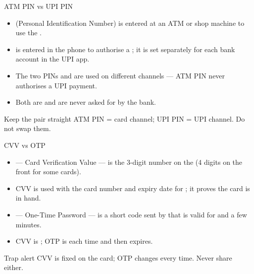 \documentclass[aspectratio=169]{beamer}
\begin{document}
\begin{frame}{ATM PIN vs UPI PIN}
  \begin{itemize}
    \item {} (Personal Identification Number) is entered at an
      ATM or shop machine to use the .
    \item {} is entered in the phone to authorise a ; it is set separately for each bank account in the UPI app.
    \item The two PINs  and are used on different
      channels --- ATM PIN never authorises a UPI payment.
    \item Both are  and are never asked for by the bank.
  \end{itemize}
  \begin{block}{Keep the pair straight}
    ATM PIN = card channel; UPI PIN = UPI channel. Do not swap them.
  \end{block}
\end{frame}

\begin{frame}{CVV vs OTP}
  \begin{itemize}
    \item {} --- Card Verification Value --- is the 3-digit number on
      the  (4 digits on the front for some cards).
    \item CVV is used with the card number and expiry date for
      ; it proves the card is in hand.
    \item {} --- One-Time Password --- is a short code sent by
       that is valid for  and a few
      minutes.
    \item CVV is ; OTP is 
      each time and then expires.
  \end{itemize}
  \begin{alertblock}{Trap alert}
    CVV is fixed on the card; OTP changes every time. Never share either.
  \end{alertblock}
\end{frame}
\end{document}
